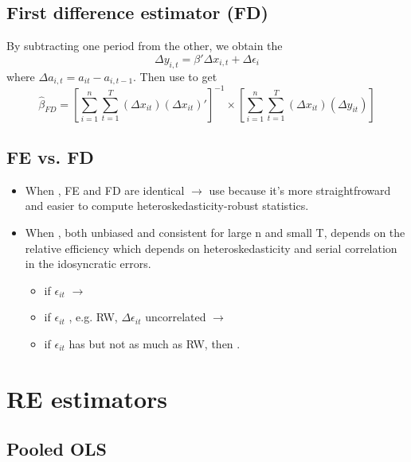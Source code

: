 \subsection{First difference estimator (FD)}

By subtracting one period from the other, we obtain the 
\begin{equation*}
    \Delta y_{i,t} = \beta'\Delta x_{i,t} + \Delta\epsilon_{i}
\end{equation*}
where $\Delta a_{i,t} = a_{it} - a_{i, t-1}$.
Then use  to get
\begin{equation*}
    \hat{\beta}_{FD} = \left[\sum_{i=1}^{n}\sum_{t=1}^{T}(\Delta x_{it})(\Delta x_{it})'\right]^{-1}\times\left[\sum_{i=1}^{n}\sum_{t=1}^{T}(\Delta x_{it})(\Delta y_{it})\right]
\end{equation*}

\subsection{FE vs. FD}

\begin{itemize}
    \item When , FE and FD are identical $\to$ use  because it's more straightfroward and easier to compute heteroskedasticity-robust statistics.
    \item When , both unbiased and consistent for large n and small T, depends on the relative efficiency which depends on heteroskedasticity and serial correlation in the idosyncratic errors.
    \begin{itemize}
        \item if $\epsilon_{it}$  $\to$ 
        \item if $\epsilon_{it}$ , e.g. RW, $\Delta \epsilon_{it}$ uncorrelated $\to$ 
        \item if $\epsilon_{it}$ has  but not as much as RW, then .
    \end{itemize}
\end{itemize}

\section{RE estimators}

\subsection{Pooled OLS}

